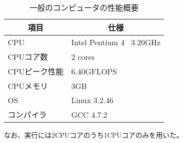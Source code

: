 \begin{table}[htb]
	\begin{center}
	\begin{tabular}{|l|l|}
\hline \hline
\multicolumn{1}{|c|}{項目} & \multicolumn{1}{|c|}{仕様} \\
\hline \hline
CPU & Intel Pentium 4 \ 3.20GHz \\
CPUコア数 & 2 cores \\
CPUピーク性能 & 6.40GFLOPS \\
CPUメモリ & 3GB \\
OS & Linux 3.2.46 \\
コンパイラ & GCC 4.7.2 \\
\hline
	\end{tabular}
	\end{center}
	\caption{一般のコンピュータの性能概要}
	\label{tb:normalpc-perf}
\end{table}

なお、実行には2CPUコアのうち1CPUコアのみを用いた。


%

